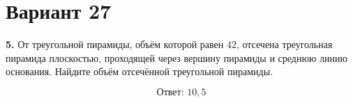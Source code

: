 \documentclass[12pt,a4paper]{article}
\begin{document}
\section*{Вариант 27}

\textbf{5.} От треугольной пирамиды, объём которой равен \(42\), отсечена
треугольная пирамида плоскостью, проходящей через вершину пирамиды
и среднюю линию основания. Найдите объём отсечённой треугольной пирамиды.

\begin{center}
\end{center}

\[
\boxed{\text{Ответ: }10{,}5}
\]
\end{document}
